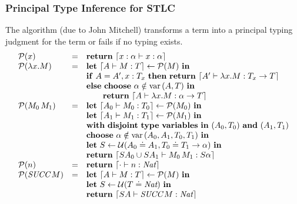 \documentclass[pdftex,aspectratio=169]{beamer}
\begin{document}
\begin{frame}
  \frametitle{Principal Type Inference for STLC}
  \small
  The algorithm (due to John Mitchell) transforms a term into a principal typing judgment for
  the term or fails if no typing exists.
  \begin{displaymath}
    \begin{array}{lcl}
      \calP (x) &=& \mathbf{return}\ \Encode{x:\alpha \vdash x : \alpha} \\
      \calP (\Lam{x} M) &=&
      \mathbf{let}\ \Encode{\Tenv \vdash M : T} \gets \calP (M) \ \mathbf{in}\\
      && \mathbf{if}\ \Tenv = \Tenv', x:T_x \ \mathbf{then\ return}\ \Encode{\Tenv'
      \vdash \Lam{x}M : T_x \to T} \\
      && \mathbf{else}\ \mathbf{choose}\ \alpha\notin\var{(\Tenv,T)}\
      \mathbf{in} \\
      &&\qquad \mathbf{return}\ \Encode{\Tenv \vdash \Lam{x}M : \alpha\to T} \\
      \calP (\App{M_0}{M_1}) &=&
      \mathbf{let}\ \Encode{\Tenv_0\vdash M_0 : T_0} \gets \calP (M_0)\ \mathbf{in} \\
      && \mathbf{let}\ \Encode{\Tenv_1\vdash M_1 : T_1} \gets \calP (M_1)\
      \mathbf{in} \\
      && \mathbf{with\ disjoint\ type\ variables\ in\ } (\Tenv_0,
      T_0)\ \mathbf{and}\ (\Tenv_1, T_1) \\
      && \mathbf{choose}\ \alpha\notin \var{(\Tenv_0,\Tenv_1,
        T_0,T_1)}\ \mathbf{in} \\
      && \mathbf{let}\ S \gets \calU (\Tenv_0 \doteq \Tenv_1, T_0
      \doteq T_1 \to \alpha)\
      \mathbf{in} \\
      && \mathbf{return}\ \Encode{S\Tenv_0 \cup S\Tenv_1 \vdash
      \App{M_0}{M_1} : S\alpha} \\
      \calP (n) &=& \mathbf{return}\ \Encode{\cdot \vdash 
      n : \Nat} \\
      \calP (\Succ M) &=& \mathbf{let}\ \Encode{\Tenv \vdash M : T} \gets
      \calP (M)\ \mathbf{in} \\
      && \mathbf{let}\ S \gets \calU (T\doteq\Nat)\ \mathbf{in} \\\
      && \mathbf{return}\ \Encode{S\Tenv \vdash \Succ M: \Nat} 
    \end{array}
  \end{displaymath}
\end{frame}
\end{document}
